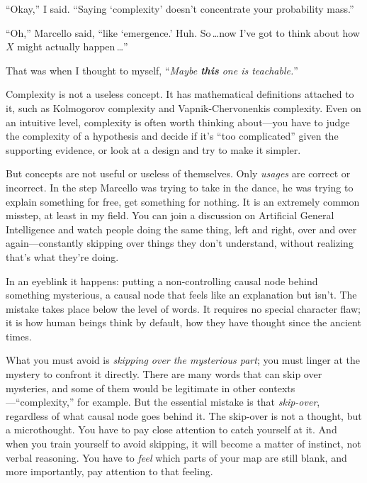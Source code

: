 {
 ``Okay,'' I said.
``Saying `complexity'
doesn't concentrate your probability
mass.''}

{
 ``Oh,'' Marcello said,
``like `emergence.'
Huh. So\,\ldots now I've got to think about how $X$ might
actually happen\,\ldots''}

{
 That was when I thought to myself,
``\textit{Maybe \textbf{this} one is
teachable.}''}

{
 Complexity is not a useless concept. It has mathematical
definitions attached to it, such as Kolmogorov complexity and
Vapnik-Chervonenkis complexity. Even on an intuitive level, complexity
is often worth thinking about---you have to judge the complexity of a
hypothesis and decide if it's ``too
complicated'' given the supporting evidence, or look
at a design and try to make it simpler.}

{
 But concepts are not useful or useless of themselves. Only
\textit{usages} are correct or incorrect. In the step Marcello was
trying to take in the dance, he was trying to explain something for
free, get something for nothing. It is an extremely common misstep, at
least in my field. You can join a discussion on Artificial General
Intelligence and watch people doing the same thing, left and right,
over and over again---constantly skipping over things they
don't understand, without realizing
that's what they're doing.}

{
 In an eyeblink it happens: putting a non-controlling causal node
behind something mysterious, a causal node that feels like an
explanation but isn't. The mistake takes place below
the level of words. It requires no special character flaw; it is how
human beings think by default, how they have thought since the ancient
times.}

{
 What you must avoid is \textit{skipping over the mysterious part};
you must linger at the mystery to confront it directly. There are many
words that can skip over mysteries, and some of them would be
legitimate in other
contexts---``complexity,'' for
example. But the essential mistake is that \textit{skip-over},
regardless of what causal node goes behind it. The skip-over is not a
thought, but a microthought. You have to pay close attention to catch
yourself at it. And when you train yourself to avoid skipping, it will
become a matter of instinct, not verbal reasoning. You have to
\textit{feel} which parts of your map are still blank, and more
importantly, pay attention to that feeling.}


